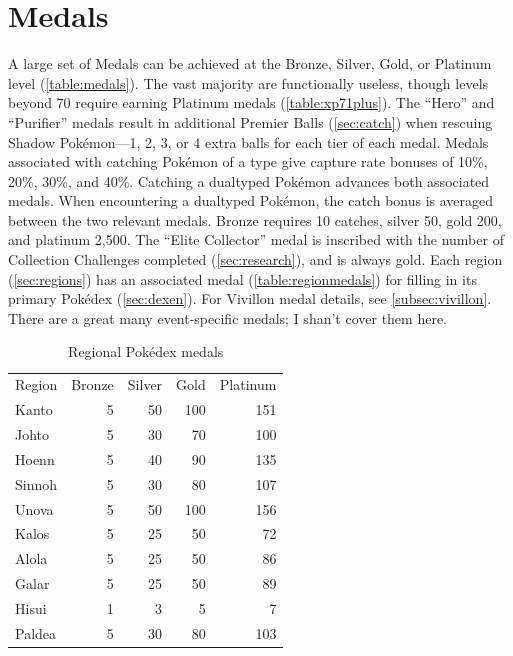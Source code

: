 \section{Medals\label{sec:medals}}
A large set of Medals can be achieved at the Bronze, Silver, Gold, or Platinum level (\autoref{table:medals}).
The vast majority are functionally useless, though levels beyond 70 require earning
  Platinum medals (\autoref{table:xp71plus}).
The ``Hero'' and ``Purifier'' medals result in additional Premier Balls (\autoref{sec:catch})
  when rescuing Shadow Pokémon---1, 2, 3, or 4 extra balls for each tier of each medal.
Medals associated with catching Pokémon of a type give capture rate bonuses of 10\%, 20\%, 30\%, and 40\%.
Catching a dualtyped Pokémon advances both associated medals.
When encountering a dualtyped Pokémon, the catch bonus is averaged between the two relevant medals.
Bronze requires 10 catches, silver 50, gold 200, and platinum 2,500.
The ``Elite Collector'' medal is inscribed with the number of Collection
  Challenges completed (\autoref{sec:research}), and is always gold.
Each region (\autoref{sec:regions}) has an associated medal (\autoref{table:regionmedals}) for filling
  in its primary Pokédex (\autoref{sec:dexen}).
For Vivillon medal details, see \autoref{subsec:vivillon}.
There are a great many event-specific medals; I shan't cover them here.
\begin{table}[th]
\footnotesize
\centering\begin{tabular}{lrrrr}
Region & Bronze & Silver & Gold & Platinum\\
\Midrule
Kanto & 5 & 50 & 100 & 151\\
Johto & 5 & 30 & 70 & 100\\
Hoenn & 5 & 40 & 90 & 135\\
Sinnoh & 5 & 30 & 80 & 107\\
Unova & 5 & 50 & 100 & 156\\
Kalos & 5 & 25 & 50 & 72\\
Alola & 5 & 25 & 50 & 86\\
Galar & 5 & 25 & 50 & 89\\
Hisui & 1 & 3 & 5 & 7\\
Paldea & 5 & 30 & 80 & 103\\
\end{tabular}\caption{Regional Pokédex medals\label{table:regionmedals}}\end{table}
